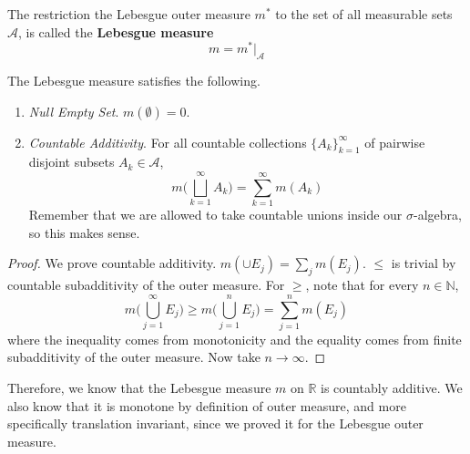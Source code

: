   \begin{definition}
    The restriction the Lebesgue outer measure $m^\ast$ to the set of all measurable sets $\mathcal{A}$, is called the \textbf{Lebesgue measure} 
    \begin{equation}
      m = m^\ast \big|_{\mathcal{A}}
    \end{equation}
  \end{definition}

  \begin{lemma}
    The Lebesgue measure satisfies the following. 
    \begin{enumerate}
      \item \textit{Null Empty Set}. $m(\emptyset) = 0$. 
      \item \textit{Countable Additivity}. For all countable collections $\{A_k\}_{k=1}^\infty$ of pairwise disjoint subsets $A_k \in \mathcal{A}$, 
      \begin{equation}
        m \bigg( \bigsqcup_{k=1}^\infty A_k \bigg) = \sum_{k=1}^\infty m(A_k)
      \end{equation}
      Remember that we are allowed to take countable unions inside our $\sigma$-algebra, so this makes sense. 
    \end{enumerate}
  \end{lemma}
  \begin{proof}
    We prove countable additivity. $m( \cup E_j) = \sum_j m(E_j)$. $\leq$ is trivial by countable subadditivity of the outer measure. For $\geq$, note that for every $n \in \mathbb{N}$, 
    \begin{equation}
      m \bigg( \bigcup_{j=1}^\infty E_j \bigg) \geq m \bigg( \bigcup_{j=1}^n E_j \bigg) = \sum_{j=1}^n m(E_j) 
    \end{equation}
    where the inequality comes from monotonicity and the equality comes from finite subadditivity of the outer measure. Now take $n \to \infty$. 
  \end{proof}

  Therefore, we know that the Lebesgue measure $m$ on $\mathbb{R}$ is countably additive. We also know that it is monotone by definition of outer measure, and more specifically translation invariant, since we proved it for the Lebesgue outer measure. 

